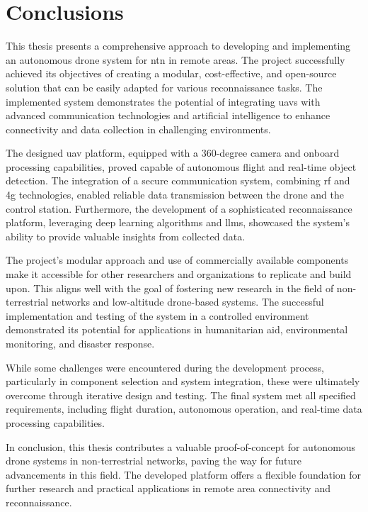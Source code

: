 \chapter{Conclusions}\label{ch:conclusions}

This thesis presents a comprehensive approach to developing and implementing an autonomous drone system for \gls{ntn} in remote areas. The project successfully achieved its objectives of creating a modular, cost-effective, and open-source solution that can be easily adapted for various reconnaissance tasks. The implemented system demonstrates the potential of integrating \glspl{uav} with advanced communication technologies and artificial intelligence to enhance connectivity and data collection in challenging environments.

The designed \gls{uav} platform, equipped with a 360-degree camera and onboard processing capabilities, proved capable of autonomous flight and real-time object detection. The integration of a secure communication system, combining \gls{rf} and \gls{4g} technologies, enabled reliable data transmission between the drone and the control station. Furthermore, the development of a sophisticated reconnaissance platform, leveraging deep learning algorithms and \glspl{llm}, showcased the system's ability to provide valuable insights from collected data.

The project's modular approach and use of commercially available components make it accessible for other researchers and organizations to replicate and build upon. This aligns well with the goal of fostering new research in the field of non-terrestrial networks and low-altitude drone-based systems. The successful implementation and testing of the system in a controlled environment demonstrated its potential for applications in humanitarian aid, environmental monitoring, and disaster response.

While some challenges were encountered during the development process, particularly in component selection and system integration, these were ultimately overcome through iterative design and testing. The final system met all specified requirements, including flight duration, autonomous operation, and real-time data processing capabilities.

In conclusion, this thesis contributes a valuable proof-of-concept for autonomous drone systems in non-terrestrial networks, paving the way for future advancements in this field. The developed platform offers a flexible foundation for further research and practical applications in remote area connectivity and reconnaissance.
